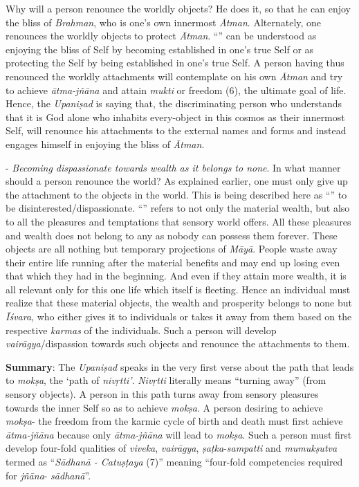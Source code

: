 Why will a person renounce the worldly objects? He does it, so that he can enjoy the bliss of \emph{Brahman}, who is one's own innermost \emph{Ātman}. Alternately, one renounces the worldly objects to protect \emph{Ātman}. ``'' can be understood as enjoying the bliss of Self by becoming established in one's true Self or as protecting the Self by being established in one's true Self. A person having thus renounced the worldly attachments will contemplate on his own \emph{Ātman} and try to achieve \emph{ātma-jñāna} and attain \emph{mukti} or freedom (6), the ultimate goal of life. Hence, the \emph{Upaniṣad} is saying that, the discriminating person who understands that it is God alone who inhabits every-object in this cosmos as their innermost Self, will renounce his attachments to the external names and forms and instead engages himself in enjoying the bliss of \emph{Ātman}.
\vskip 1.1pt

- \emph{Becoming dispassionate towards wealth as it belongs to none}. In what manner should a person renounce the world? As explained earlier, one must only give up the attachment to the objects in the world. This is being described here as ``'' to be disinterested/dispassionate. ``'' refers to not only the material wealth, but also to all the pleasures and temptations that sensory world offers. All these pleasures and wealth does not belong to any as nobody can possess them forever. These objects are all nothing but temporary projections of \emph{Māyā}. People waste away their entire life running after the material benefits and may end up losing even that which they had in the beginning. And even if they attain more wealth, it is all relevant only for this one life which itself is fleeting. Hence an individual must realize that these material objects, the wealth and prosperity belongs to none but \emph{Īśvara}, who either gives it to individuals or takes it away from them based on the respective \emph{karmas} of the individuals. Such a person will develop \emph{vairāgya}/dispassion towards such objects and renounce the attachments to them.
\vskip 1.1pt

\textbf{Summary}: The \emph{Upaniṣad} speaks in the very first verse about the path that leads to \emph{mokṣa}, the `path of \emph{nivṛtti'}. \emph{Nivṛtti} literally means ``turning away'' (from sensory objects). A person in this path turns away from sensory pleasures towards the inner Self so as to achieve \emph{mokṣa}. A person desiring to achieve \emph{mokṣa}- the freedom from the karmic cycle of birth and death must first achieve \emph{ātma-jñāna} because only \emph{ātma-jñāna} will lead to \emph{mokṣa}. Such a person must first develop four-fold qualities of \emph{viveka}, \emph{vairāgya}, \emph{ṣaṭka}-\emph{sampatti} and \emph{mumukṣutva} termed as ``\emph{Sādhanā - Catuṣṭaya} (7)'' meaning ``four-fold competencies required for \emph{jñāna}- \emph{sādhanā}''.
\vskip 1.1pt

